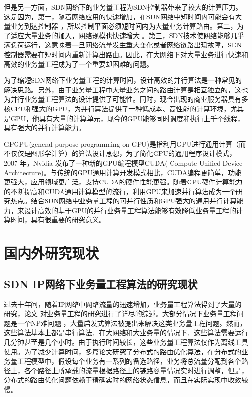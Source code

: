 \documentclass[master]{thesis-uestc}
\begin{document}
但是另一方面，SDN网络下的业务量工程为SDN控制器带来了较大的计算压力。这是因为，第一，随着网络应用的快速增加，在SDN网络中短时间内可能会有大量业务到达控制器 ，所以控制平面必须短时间内为大量业务计算路由。第二，为了适应大量业务的加入，网络规模也快速增大 。第三，SDN技术使网络能够几乎满负荷运行，这意味着一旦网络流量发生重大变化或者网络链路出现故障，SDN控制器需要在短时间内重新计算出路由。因此，在大网络下对大量业务进行快速和高效的业务量工程成为了一个重要却困难的问题。

为了缩短SDN网络下业务量工程的计算时间，设计高效的并行算法是一种常见的解决思路。另外，由于业务量工程中大量业务之间的路由计算是相互独立的，这也为并行业务量工程算法的设计提供了可能性。同时，现今出现的商业服务器具有多核CPU和强大的GPU，为并行算法提供了一种低成本、高性能的计算环境，尤其是GPU，他具有大量的计算单元，现今的GPU能够同时调度和执行上千个线程，具有强大的并行计算能力。

GPGPU(general purpose programming on GPU)是指利用GPU进行通用计算（而不仅仅是图形学计算）的算法设计思想，为了简化GPU的通用程序设计模式，2007 年，Nvidia 发布了一种新的GPU编程模型CUDA( Compute Unified Device Architecture)。与传统的GPU通用计算开发模式相比，CUDA编程更简单，功能更强大，应用领域更广泛，支持CUDA的硬件性能更强。随着GPU硬件计算能力的不断提高和CUDA通用计算模型的流行，利用GPU来加速并行算法成为一个研究热点。结合SDN网络中业务量工程的可并行性质和GPU强大的通用并行计算能力，来设计高效的基于GPU的并行业务量工程算法能够有效降低业务量工程的计算时间，具有很重要的研究意义。



\section{国内外研究现状}
\subsection{SDN IP网络下业务量工程算法的研究现状}
过去十年间，随着IP网络中网络流量的迅速增加，业务量工程算法得到了大量的研究，论文 对业务量工程的研究进行了详尽的综述。大部分情况下业务量工程问题是一个NP难问题 ，大量启发式算法被提出来解决这类业务量工程问题。然而，这些算法基本上都是串行算法，在大网络和大业务量的情况下，这些算法需要运行几分钟甚至是几个小时。由于执行时间较长，这些业务量工程算法仅作为离线工具使用。为了减少计算时间，多篇论文研究了分布式的路由优化算法，在分布式的业务量工程模型中，假设每个业务有一系列的备选路径，业务将总流量分配到各个路径上，各个路径上所承载的流量根据路径上的链路容量情况实时进行调整，但是，分布式的路由优化问题依赖于精确实时的网络状态信息，而且在实际实现中收敛较慢。
\end{document}
